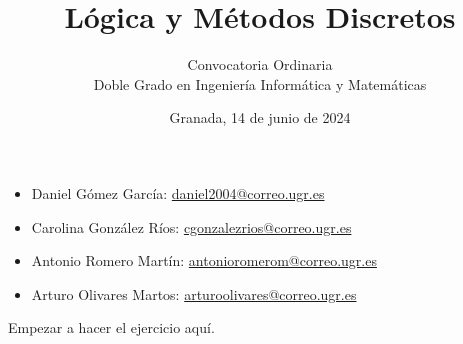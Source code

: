 \documentclass[12pt]{article}
\newcommand{\email}[1]{\href{mailto:#1}{{{\color{blue}#1}}}}
\begin{document}

    \pretitle{\begin{center}\bfseries\fontsize{42}{56}\selectfont}
    \posttitle{\par\end{center}\vspace{2em}}

    \preauthor{\begin{center}\Large}
    \postauthor{\par\end{center}\vspace{3em}}
    
    \predate{\begin{center}\huge}
    \postdate{\par\end{center}\vspace{5em}}
    
    \title{Lógica y Métodos Discretos}
    \author{{Convocatoria Ordinaria}\\
    \vspace{1cm}Doble Grado en Ingeniería Informática y Matemáticas}
    \date{Granada, 14 de junio de 2024}
    \thispagestyle{empty}               %
    \maketitle
    \vfill
    

    \begin{itemize}
        \item[]Daniel Gómez García:
        \email{daniel2004@correo.ugr.es}

        \item[]Carolina González Ríos:
        \email{cgonzalezrios@correo.ugr.es}

        \item[]Antonio Romero Martín:
        \email{antonioromerom@correo.ugr.es}

        \item[]Arturo Olivares Martos:
        \email{arturoolivares@correo.ugr.es}
    \end{itemize}
    \newpage

    \fancyhead[R]{\helv \nouppercase{\rightmark}}

    \begin{ejercicio}
        Empezar a hacer el ejercicio aquí.
    \end{ejercicio}

    
\end{document}
